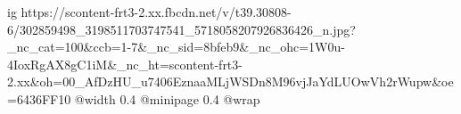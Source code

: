  
 
 
 
 

\ifcmt
  ig https://scontent-frt3-2.xx.fbcdn.net/v/t39.30808-6/302859498_3198511703747541_5718058207926836426_n.jpg?_nc_cat=100&ccb=1-7&_nc_sid=8bfeb9&_nc_ohc=1W0u-4IoxRgAX8gC1iM&_nc_ht=scontent-frt3-2.xx&oh=00_AfDzHU_u7406EznaaMLjWSDn8M96vjJaYdLUOwVh2rWupw&oe=6436FF10
  @width 0.4
  @minipage 0.4
  @wrap \parpic[r]
\fi
